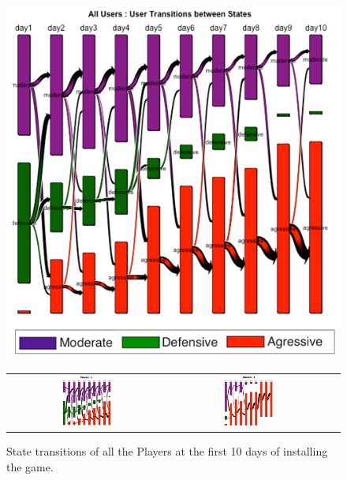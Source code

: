 \begin{figure}[h]
\begin{minipage}[b]{0.3\linewidth}
    \centering
    \includegraphics[width=0.8\linewidth]{transitions} 
    \caption{State transitions of all the Players at the first 10 days of installing the game.}
    \label{fig:transitions}
\end{minipage}
\quad
\begin{minipage}[b]{0.65\linewidth}
    \centering
        \begin{tabular}{ccc}
         \includegraphics[width=0.33\textwidth]{cluster1} &
         \includegraphics[width=0.33\textwidth]{cluster2} &

\end{tabular}
\end{minipage}
\end{figure}
